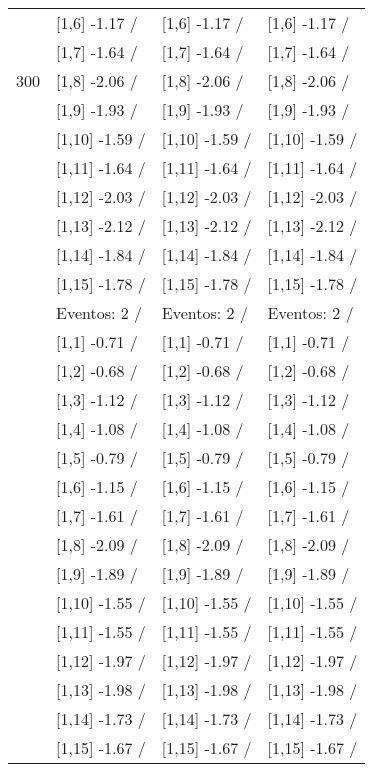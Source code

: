 \begin{table}
\begin{tabular}[t]{llll}
 & {}[1,6] -1.17  / & {}[1,6] -1.17  / & {}[1,6] -1.17  /\\
 & {}[1,7] -1.64  / & {}[1,7] -1.64  / & {}[1,7] -1.64  /\\
300 & {}[1,8] -2.06  / & {}[1,8] -2.06  / & {}[1,8] -2.06  /\\
\addlinespace
 & {}[1,9] -1.93  / & {}[1,9] -1.93  / & {}[1,9] -1.93  /\\
 & {}[1,10] -1.59  / & {}[1,10] -1.59  / & {}[1,10] -1.59  /\\
 & {}[1,11] -1.64  / & {}[1,11] -1.64  / & {}[1,11] -1.64  /\\
 & {}[1,12] -2.03  / & {}[1,12] -2.03  / & {}[1,12] -2.03  /\\
 & {}[1,13] -2.12  / & {}[1,13] -2.12  / & {}[1,13] -2.12  /\\
\addlinespace
 & {}[1,14] -1.84  / & {}[1,14] -1.84  / & {}[1,14] -1.84  /\\
 & {}[1,15] -1.78  / & {}[1,15] -1.78  / & {}[1,15] -1.78  /\\
 & Eventos:  2 / & Eventos:  2 / & Eventos:  2 /\\
 & {}[1,1] -0.71  / & {}[1,1] -0.71  / & {}[1,1] -0.71  /\\
 & {}[1,2] -0.68  / & {}[1,2] -0.68  / & {}[1,2] -0.68  /\\
\addlinespace
 & {}[1,3] -1.12  / & {}[1,3] -1.12  / & {}[1,3] -1.12  /\\
 & {}[1,4] -1.08  / & {}[1,4] -1.08  / & {}[1,4] -1.08  /\\
 & {}[1,5] -0.79  / & {}[1,5] -0.79  / & {}[1,5] -0.79  /\\
 & {}[1,6] -1.15  / & {}[1,6] -1.15  / & {}[1,6] -1.15  /\\
 & {}[1,7] -1.61  / & {}[1,7] -1.61  / & {}[1,7] -1.61  /\\
\addlinespace
500 & {}[1,8] -2.09  / & {}[1,8] -2.09  / & {}[1,8] -2.09  /\\
 & {}[1,9] -1.89  / & {}[1,9] -1.89  / & {}[1,9] -1.89  /\\
 & {}[1,10] -1.55  / & {}[1,10] -1.55  / & {}[1,10] -1.55  /\\
 & {}[1,11] -1.55  / & {}[1,11] -1.55  / & {}[1,11] -1.55  /\\
 & {}[1,12] -1.97  / & {}[1,12] -1.97  / & {}[1,12] -1.97  /\\
\addlinespace
 & {}[1,13] -1.98  / & {}[1,13] -1.98  / & {}[1,13] -1.98  /\\
 & {}[1,14] -1.73  / & {}[1,14] -1.73  / & {}[1,14] -1.73  /\\
 & {}[1,15] -1.67  / & {}[1,15] -1.67  / & {}[1,15] -1.67  /\\
\bottomrule
\end{tabular}
\end{table}
